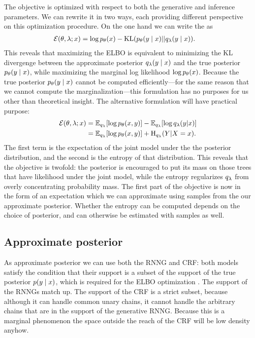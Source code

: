     The objective is optimized with respect to both the generative and inference parameters. We can rewrite it in two ways, each providing different perspective on this optimization procedure. On the one hand we can write the as \citep{blei2016vi}
    \begin{align*}
      \operatorname{\mathcal{E}}(\theta, \lambda; x) &= \log p_{\theta}(x) - \operatorname{KL}(p_{\theta}(y \mid x) \rvert\lvert q_{\lambda}(y \mid x)).
    \end{align*}
    This reveals that maximizing the ELBO is equivalent to minimizing the KL divergenge between the approximate posterior $q_{\lambda}(y \mid x)$ and the true posterior $p_{\theta}(y \mid x)$, while maximizing the marginal log likelihood $\log p_{\theta}(x)$. Because the true posterior $p_{\theta}(y \mid x)$ cannot be computed efficiently---for the same reason that we cannot compute the marginalization---this formulation has no purposes for us other than theoretical insight. The alternative formulation will have practical purpose:
    \begin{align}
      \operatorname{\mathcal{E}}(\theta, \lambda; x)
        &= \operatorname{\mathbb{E}}_{q_{\lambda}} [ \log p_{\theta}( x, y ) ] - \operatorname{\mathbb{E}}_{q_{\lambda}} [ \log q_{\lambda}(y | x) ]  \nonumber \\
        &= \operatorname{\mathbb{E}}_{q_{\lambda}} [ \log p_{\theta}( x, y ) ] + \operatorname{H}_{q_{\lambda}}(Y | X = x).
    \end{align}
    The first term is the expectation of the joint model under the the posterior distribution, and the second is the entropy of that distribution. This reveals that the objective is twofold: the posterior is encouraged to put its mass on those trees that have likelihood under the joint model, while the entropy regularizes $q_{\lambda}$ from overly concentrating probability mass. The first part of the objective is now in the form of an expectation which we can approximate using samples from the our approximate posterior. Whether the entropy can be computed depends on the choice of posterior, and can otherwise be estimated with samples as well.

  \subsection{Approximate posterior}
    As approximate posterior we can use both the RNNG and CRF: both models satisfy the condition that their support is a subset of the support of the true posterior $p(y \mid x)$, which is required for the ELBO optimization \citep{kucukelbir2017automatic}. The support of the RNNGs match up. The support of the CRF is a strict subset, because although it can handle common unary chains, it cannot handle the arbitrary chains that are in the support of the generative RNNG. Because this is a marginal phenomenon the space outside the reach of the CRF will be low density anyhow.

